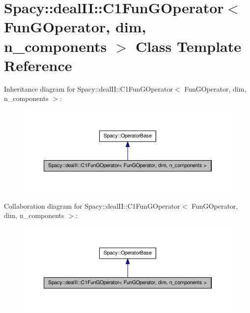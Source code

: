 \hypertarget{classSpacy_1_1dealII_1_1C1FunGOperator}{\section{\-Spacy\-:\-:deal\-I\-I\-:\-:\-C1\-Fun\-G\-Operator$<$ \-Fun\-G\-Operator, dim, n\-\_\-components $>$ \-Class \-Template \-Reference}
\label{classSpacy_1_1dealII_1_1C1FunGOperator}
}


\-Inheritance diagram for \-Spacy\-:\-:deal\-I\-I\-:\-:\-C1\-Fun\-G\-Operator$<$ \-Fun\-G\-Operator, dim, n\-\_\-components $>$\-:
\nopagebreak
\begin{figure}[H]
\begin{center}
\leavevmode
\includegraphics[width=350pt]{classSpacy_1_1dealII_1_1C1FunGOperator__inherit__graph}
\end{center}
\end{figure}


\-Collaboration diagram for \-Spacy\-:\-:deal\-I\-I\-:\-:\-C1\-Fun\-G\-Operator$<$ \-Fun\-G\-Operator, dim, n\-\_\-components $>$\-:
\nopagebreak
\begin{figure}[H]
\begin{center}
\leavevmode
\includegraphics[width=350pt]{classSpacy_1_1dealII_1_1C1FunGOperator__coll__graph}
\end{center}
\end{figure}

